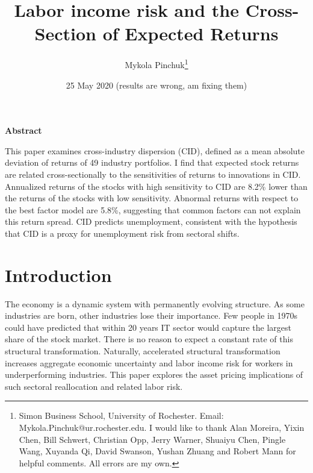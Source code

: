 \documentclass[12pt]{article}
\begin{document}
\onehalfspacing      %
\renewcommand{\footnote}{\endnote}  %

\author{\large{Mykola Pinchuk}\thanks{\rm Simon Business School, University of Rochester. Email: Mykola.Pinchuk@ur.rochester.edu. \newline I would like to thank Alan Moreira, Yixin Chen, Bill Schwert, Christian Opp, Jerry Warner, Shuaiyu Chen, Pingle Wang, Xuyanda Qi, David Swanson, Yushan Zhuang and Robert Mann for helpful comments. All errors are my own.}}

\title{\bf Labor income risk and the Cross-Section of Expected Returns}

\date{25 May 2020 (results are wrong, am fixing them)}  

\maketitle
\thispagestyle{empty}

\bigskip

\normalsize
\vspace{1cm}

\centerline{\bf Abstract}

\vspace{0.5cm}

\begin{onehalfspace}  %
  \noindent This paper examines cross-industry dispersion (CID), defined as a mean absolute deviation of returns of 49 industry portfolios. I find that expected stock returns are related cross-sectionally to the sensitivities of returns to innovations in CID. Annualized returns of the stocks with high sensitivity to CID are 8.2\% lower than the returns of the stocks with low sensitivity. Abnormal returns with respect to the best factor model are 5.8\%, suggesting that common factors can not explain this return spread. CID predicts unemployment, consistent with the hypothesis that CID is a proxy for unemployment risk from sectoral shifts. 
\end{onehalfspace}
\medskip


\clearpage
{}


\section{Introduction} \label{sec:Model}
The economy is a dynamic system with permanently evolving structure. As some industries are born, other industries lose their importance. Few people in 1970s could have predicted that within 20 years IT sector would capture the largest share of the stock market. There is no reason to expect a constant rate of this structural transformation. Naturally, accelerated structural transformation increases aggregate economic uncertainty and labor income risk for workers in underperforming industries. This paper explores the asset pricing implications of such sectoral reallocation and related labor risk.
\end{document}
